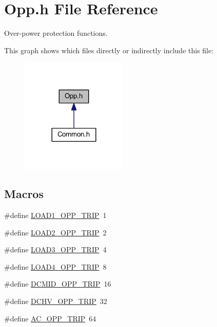 \hypertarget{a00032}{\section{Opp.\-h File Reference}
\label{a00032}
}


Over-\/power protection functions.  


This graph shows which files directly or indirectly include this file\-:\nopagebreak
\begin{figure}[H]
\begin{center}
\leavevmode
\includegraphics[width=144pt]{a00068}
\end{center}
\end{figure}
\subsection*{Macros}
\begin{DoxyCompactItemize}
\item 
\#define \hyperlink{a00032_afe8a1619d93171d3cc6de1547cb65982}{L\-O\-A\-D1\-\_\-\-O\-P\-P\-\_\-\-T\-R\-I\-P}~1
\item 
\#define \hyperlink{a00032_a2f2ad16c48f8bfdb51272ac7c001b005}{L\-O\-A\-D2\-\_\-\-O\-P\-P\-\_\-\-T\-R\-I\-P}~2
\item 
\#define \hyperlink{a00032_afb895ec8b4e74e28a73708371b75cdb7}{L\-O\-A\-D3\-\_\-\-O\-P\-P\-\_\-\-T\-R\-I\-P}~4
\item 
\#define \hyperlink{a00032_afb8941d83fb2ddbdf96fdf7ac8f5d259}{L\-O\-A\-D4\-\_\-\-O\-P\-P\-\_\-\-T\-R\-I\-P}~8
\item 
\#define \hyperlink{a00032_ac02d3bbcf9e07f26248ae2f667713770}{D\-C\-M\-I\-D\-\_\-\-O\-P\-P\-\_\-\-T\-R\-I\-P}~16
\item 
\#define \hyperlink{a00032_af157ad216f4a380ac6db0b81cb384e4a}{D\-C\-H\-V\-\_\-\-O\-P\-P\-\_\-\-T\-R\-I\-P}~32
\item 
\#define \hyperlink{a00032_adf494b474f7ddb554f7d6095fa5bf387}{A\-C\-\_\-\-O\-P\-P\-\_\-\-T\-R\-I\-P}~64
\end{DoxyCompactItemize}
